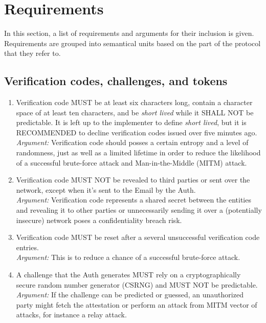 \section{Requirements}
In this section, a list of requirements and arguments for their inclusion is given. Requirements are grouped into 
semantical units based on the part of the protocol that they refer to.

    \subsection{Verification codes, challenges, and tokens}
        \begin{enumerate}
            \item Verification code MUST be at least six characters long, contain a character space of at 
                  least ten characters, and be \textit{short lived} while it SHALL NOT be predictable. It is 
                  left up to the implementer to define \textit{short lived}, but it is RECOMMENDED to decline 
                  verification codes issued over five minutes ago.\\    
            \textit{Argument:} Verification code should posses a certain entropy and a level of randomness, 
                               just as well as a limited lifetime in order to reduce  the likelihood of a 
                               successful brute-force attack and Man-in-the-Middle (MITM) attack.

            \item Verification code MUST NOT be revealed to third parties or sent over the network, 
                  except when it's sent to the Email by the Auth.\\        
            \textit{Argument:} Verification code represents a shared secret between the entities and revealing 
                               it to other parties or unnecessarily sending it over a (potentially insecure) 
                               network poses a confidentiality breach risk.

            \item Verification code MUST be reset after a several unsuccessful verification code entries.\\        
            \textit{Argument:} This is to reduce a chance of a successful brute-force attack.

            \item A challenge that the Auth generates MUST rely on a cryptographically secure random number 
                  generator (CSRNG) and MUST NOT be predictable.\\
            \textit{Argument:} If the challenge can be predicted or guessed, an unauthorized party might fetch the
                               attestation or perform an attack from MITM vector of attacks, for instance a relay 
                               attack.


\end{enumerate}
